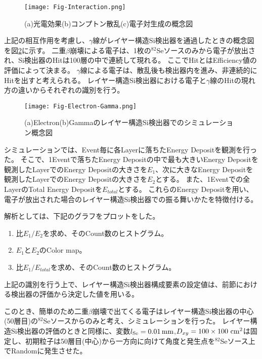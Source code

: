 \documentclass[a4paper,10pt]{jreport}
\begin{document}
\begin{figure}[H]
	\center
	\texttt{[image: Fig-Interaction.png]}
	\caption{(a)光電効果(b)コンプトン散乱(c)電子対生成の概念図} \label{Fig-Interaction}
\end{figure}

上記の相互作用を考慮し、$\gamma$線がレイヤー構造Si検出器を通過したときの概念図を図\ref{Fig-Electron-Gamma}に示す。
二重$\beta$崩壊による電子は、1枚の$^{82}$Seソースのみから電子が放出され、Si検出器のHitは100層の中で連続して現れる。
ここでHitとはEfficiency値の評価によって決まる。
$\gamma$線による電子は、散乱後も検出器内を進み、非連続的にHitを出すと考えられる。
レイヤー構造Si検出器における電子と$\gamma$線のHitの現れ方の違いからそれぞれの識別を行う。

\begin{figure}[H]
	\center
	\texttt{[image: Fig-Electron-Gamma.png]}
	\caption{(a)Electron(b)Gammaのレイヤー構造Si検出器でのシミュレーション概念図} \label{Fig-Electron-Gamma}
\end{figure}

シミュレーションでは、Event毎に各Layerに落ちたEnergy Depositを観測を行った。
そこで、1Eventで落ちたEnergy Depositの中で最も大きいEnergy Depositを観測したLayerでのEnergy Depositの大きさを$E_1$、次に大きなEnergy Depositを観測したLayerでのEnergy Depositの大きさを$E_2$とする。
また、1Eventでの全LayerのTotal Energy Depositを$E_{total}$とする。
これらのEnergy Depositを用い、電子が放出された場合のレイヤー構造Si検出器での振る舞いかたを特徴付ける。

解析としては、下記のグラフをプロットをした。

\begin{enumerate}
	\item 比$E_1/E_2$を求め、そのCount数のヒストグラム。
	\item $E_1$と$E_2$のColor map。
	\item 比$E_1/E_{total}$を求め、そのCount数のヒストグラム。
\end{enumerate}

上記の識別を行う上で、レイヤー構造Si検出器構成要素の設定値は、前節における検出器の評価から決定した値を用いる。

このとき、簡単のため二重$\beta$崩壊で出てくる電子はレイヤー構造Si検出器の中心(50層目)の$^{82}$Seソースからのみと考え、シミュレーションを行った。
レイヤー構造Si検出器の評価のときと同様に、変数$l_{\rm{Se}} = \SI{0.01}{mm}$,$D_{xy} =100\times100\ \rm{cm}^2$は固定し、初期粒子は50層目(中心)から一方向に向けて角度と発生点を$^{82}$Seソース上でRandomに発生させた。
\end{document}
